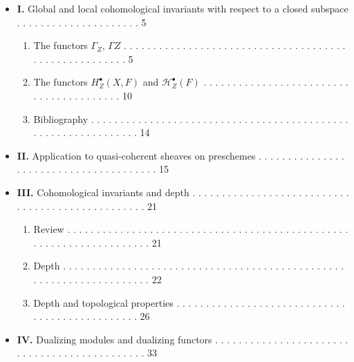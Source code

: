 \documentclass[
  11pt,
  a4paper,
]{book}
\providecommand{\tightlist}{%
  \setlength{\itemsep}{0pt}\setlength{\parskip}{0pt}}
\begin{document}
\begin{itemize}
\item
  \textbf{I.} Global and local cohomological invariants with respect to
  a closed subspace . . . . . . . . . . . . . . . . . . . . . 5

  \begin{enumerate}
  \def\labelenumi{\arabic{enumi}.}
  \tightlist
  \item
    The functors \(\Gamma_{Z}\), \(\Gamma Z\) . . . . . . . . . . . . .
    . . . . . . . . . . . . . . . . . . . . . . . . . . . . . . . . . .
    . . . . . . . 5
  \item
    The functors \(H^{\bullet}_{Z}(X, F)\) and
    \(\mathcal{H}^{\bullet}_{Z}(F)\) . . . . . . . . . . . . . . . . . .
    . . . . . . . . . . . . . . . . . . . . . . 10
  \item
    Bibliography . . . . . . . . . . . . . . . . . . . . . . . . . . . .
    . . . . . . . . . . . . . . . . . . . . . . . . . . . . . . . . . .
    14
  \end{enumerate}
\item
  \textbf{II.} Application to quasi-coherent sheaves on preschemes . . .
  . . . . . . . . . . . . . . . . . . . . . . . . . . . . . . . . . . .
  . 15
\item
  \textbf{III.} Cohomological invariants and depth . . . . . . . . . . .
  . . . . . . . . . . . . . . . . . . . . . . . . . . . . . . . . . . .
  . . . 21

  \begin{enumerate}
  \def\labelenumi{\arabic{enumi}.}
  \tightlist
  \item
    Review . . . . . . . . . . . . . . . . . . . . . . . . . . . . . . .
    . . . . . . . . . . . . . . . . . . . . . . . . . . . . . . . . . .
    . . . 21
  \item
    Depth . . . . . . . . . . . . . . . . . . . . . . . . . . . . . . .
    . . . . . . . . . . . . . . . . . . . . . . . . . . . . . . . . . .
    . . . 22
  \item
    Depth and topological properties . . . . . . . . . . . . . . . . . .
    . . . . . . . . . . . . . . . . . . . . . . . . . . . . . 26
  \end{enumerate}
\item
  \textbf{IV.} Dualizing modules and dualizing functors . . . . . . . .
  . . . . . . . . . . . . . . . . . . . . . . . . . . . . . . . . . . .
  . . 33


\end{itemize}
\end{document}
